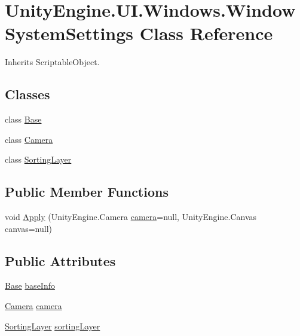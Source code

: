 \hypertarget{class_unity_engine_1_1_u_i_1_1_windows_1_1_window_system_settings}{}\section{Unity\+Engine.\+U\+I.\+Windows.\+Window\+System\+Settings Class Reference}
\label{class_unity_engine_1_1_u_i_1_1_windows_1_1_window_system_settings}


Inherits Scriptable\+Object.

\subsection*{Classes}
\begin{DoxyCompactItemize}
\item 
class \hyperlink{class_unity_engine_1_1_u_i_1_1_windows_1_1_window_system_settings_1_1_base}{Base}
\item 
class \hyperlink{class_unity_engine_1_1_u_i_1_1_windows_1_1_window_system_settings_1_1_camera}{Camera}
\item 
class \hyperlink{class_unity_engine_1_1_u_i_1_1_windows_1_1_window_system_settings_1_1_sorting_layer}{Sorting\+Layer}
\end{DoxyCompactItemize}
\subsection*{Public Member Functions}
\begin{DoxyCompactItemize}
\item 
void \hyperlink{class_unity_engine_1_1_u_i_1_1_windows_1_1_window_system_settings_aed8a449999005540dbc2bd57065df512}{Apply} (Unity\+Engine.\+Camera \hyperlink{class_unity_engine_1_1_u_i_1_1_windows_1_1_window_system_settings_a685b76f7373c278105c1d4550fae23fe}{camera}=null, Unity\+Engine.\+Canvas canvas=null)
\end{DoxyCompactItemize}
\subsection*{Public Attributes}
\begin{DoxyCompactItemize}
\item 
\hyperlink{class_unity_engine_1_1_u_i_1_1_windows_1_1_window_system_settings_1_1_base}{Base} \hyperlink{class_unity_engine_1_1_u_i_1_1_windows_1_1_window_system_settings_ad6cdaa57a87b7e3f987a51247ec3b19a}{base\+Info}
\item 
\hyperlink{class_unity_engine_1_1_u_i_1_1_windows_1_1_window_system_settings_1_1_camera}{Camera} \hyperlink{class_unity_engine_1_1_u_i_1_1_windows_1_1_window_system_settings_a685b76f7373c278105c1d4550fae23fe}{camera}
\item 
\hyperlink{class_unity_engine_1_1_u_i_1_1_windows_1_1_window_system_settings_1_1_sorting_layer}{Sorting\+Layer} \hyperlink{class_unity_engine_1_1_u_i_1_1_windows_1_1_window_system_settings_a5777169e9abf9d32058b1a57cc78fded}{sorting\+Layer}
\end{DoxyCompactItemize}


